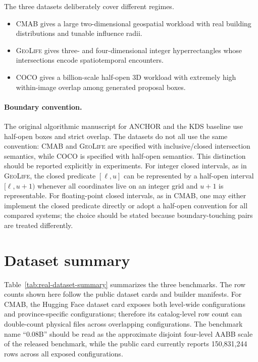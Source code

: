 \documentclass[11pt]{article}
\newcommand{\cmab}{\textsc{CMAB}}
\newcommand{\geolife}{\textsc{GeoLife}}
\newcommand{\coco}{\textsc{COCO}}
\begin{document}
The three datasets deliberately cover different regimes.
\begin{itemize}[leftmargin=2em,itemsep=2pt]
  \item \cmab{} gives a large two-dimensional geospatial workload with real building distributions and tunable influence radii.
  \item \geolife{} gives three- and four-dimensional integer hyperrectangles whose intersections encode spatiotemporal encounters.
  \item \coco{} gives a billion-scale half-open 3D workload with extremely high within-image overlap among generated proposal boxes.
\end{itemize}

\paragraph{Boundary convention.}
The original algorithmic manuscript for ANCHOR and the KDS baseline use half-open boxes and strict overlap.  The datasets do not all use the same convention: \cmab{} and \geolife{} are specified with inclusive/closed intersection semantics, while \coco{} is specified with half-open semantics.  This distinction should be reported explicitly in experiments.  For integer closed intervals, as in \geolife{}, the closed predicate $[\ell,u]$ can be represented by a half-open interval $[\ell,u+1)$ whenever all coordinates live on an integer grid and $u+1$ is representable.  For floating-point closed intervals, as in \cmab{}, one may either implement the closed predicate directly or adopt a half-open convention for all compared systems; the choice should be stated because boundary-touching pairs are treated differently.

\section{Dataset summary}
\label{sec:summary}

Table~\ref{tab:real-dataset-summary} summarizes the three benchmarks.  The row counts shown here follow the public dataset cards and builder manifests.  For \cmab{}, the Hugging Face dataset card exposes both level-wide configurations and province-specific configurations; therefore its catalog-level row count can double-count physical files across overlapping configurations.  The benchmark name ``0.08B'' should be read as the approximate disjoint four-level AABB scale of the released benchmark, while the public card currently reports 150,831,244 rows across all exposed configurations.
\end{document}
